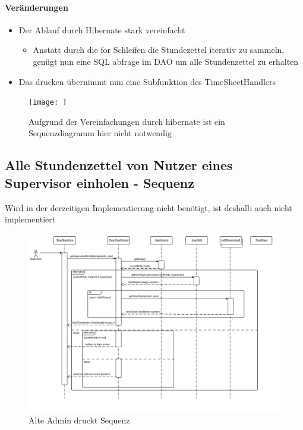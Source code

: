     \paragraph{Veränderungen}
    \begin{itemize}
        \item Der Ablauf durch Hibernate stark vereinfacht
        \begin{itemize}
            \item Anstatt durch die for Schleifen die Stundezettel iterativ zu sammeln, genügt nun eine SQL abfrage im DAO um alle Stundenzettel zu erhalten
        \end{itemize}
        \item Das drucken übernimmt nun eine Subfunktion des TimeSheetHandlers
    \end{itemize}

    \begin{figure}
      \centering
        \texttt{[image: ]}
       \caption{Aufgrund der Vereinfachungen durch hibernate ist ein Sequenzdiagramm hier nicht notwendig}
    \end{figure}


    \subsection{Alle Stundenzettel von Nutzer eines Supervisor einholen - Sequenz}

        Wird in der derzeitigen Implementierung nicht benötigt, ist deshalb auch nicht implementiert
        \begin{figure}
          \centering
            \includegraphics[width=\linewidth]{Get-timesheets-of-all-supervised-users.svg}
           \caption{Alte Admin druckt Sequenz}
        \end{figure}

